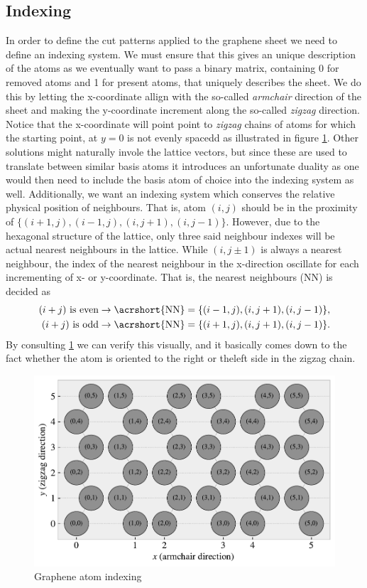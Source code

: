 \subsection{Indexing}
In order to define the cut patterns applied to the graphene sheet we need to
define an indexing system. We must ensure that this gives an unique description
of the atoms as we eventually want to pass a binary matrix, containing 0 for
removed atoms and 1 for present atoms, that uniquely describes the sheet. We do
this by letting the x-coordinate allign with the so-called \textit{armchair}
direction of the sheet and making the y-coordinate increment along the
so-called \textit{zigzag} direction. Notice that the x-coordinate will point
point to \textit{zigzag} chains of atoms for which the starting point, at $y = 0$ is not evenly spacedd as illustrated in figure \cref{fig:atom_indexing}. Other solutions
might naturally invole the lattice vectors, but since these are used to
translate between similar basis atoms it introduces an unfortunate duality as
one would then need to include the basis atom of choice into the indexing system
as well. Additionally, we want an indexing system which conserves the relative
physical position of neighbours. That is, atom $(i, j)$ should be in the
proximity of $\{(i+1, j), (i-1, j), (i, j+1), (i, j-1)\}$. However, due to the hexagonal structure of the lattice, only three said neighbour indexes will be actual nearest neighbours in the lattice. While $(i, j\pm 1)$ is always a nearest neighbour, the index of the nearest neighbour in the x-direction oscillate for each incrementing of x- or y-coordinate. That is, the nearest neighbours (\acrshort{NN}) is decided as
\begin{equation}
  \begin{aligned}
    (i + j) \ \text{is even} &\rightarrow \text{\acrshort{NN}} = \{(i-1, j), (i, j+1), (i, j-1)\}, \\
    (i + j) \ \text{is odd} &\rightarrow \text{\acrshort{NN}} = \{(i+1, j), (i, j+1), (i, j-1)\}.
  \end{aligned}
  \label{eq:atom_neigh_idx}
\end{equation}
By consulting \cref{fig:atom_indexing} we can verify this visually, and it basically comes down to the fact whether the atom is oriented to the right or theleft side in the zigzag chain.

\begin{figure}[H]
  \centering
  \includegraphics[width=0.7\linewidth]{figures/system/atom_indexing.pdf}
  \caption{Graphene atom indexing}
  \label{fig:atom_indexing}
\end{figure}



